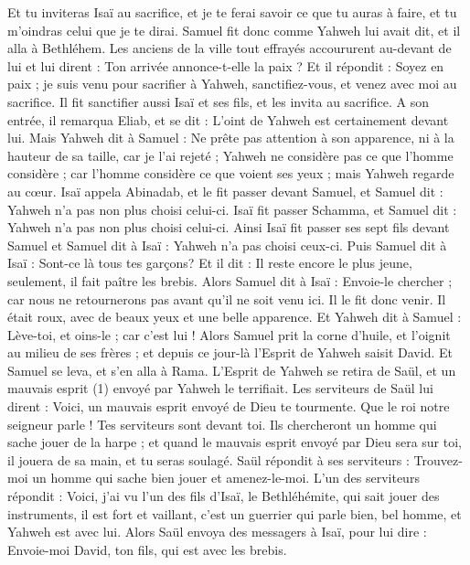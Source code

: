 \begin{multicols}{2}
Et tu inviteras Isaï au sacrifice, et je te ferai savoir ce que tu auras à faire, et tu m'oindras celui que je te dirai.
Samuel fit donc comme Yahweh lui avait dit, et il alla à Bethléhem. Les anciens de la ville tout effrayés accoururent au-devant de lui et lui dirent : Ton arrivée annonce-t-elle la paix ?
Et il répondit : Soyez en paix ; je suis venu pour sacrifier à Yahweh, sanctifiez-vous, et venez avec moi au sacrifice. Il fit sanctifier aussi Isaï et ses fils, et les invita au sacrifice.
A son entrée, il remarqua Eliab, et se dit : L'oint de Yahweh est certainement devant lui.
Mais Yahweh dit à Samuel : Ne prête pas attention à son apparence, ni à la hauteur de sa taille, car je l'ai rejeté ; Yahweh ne considère pas ce que l'homme considère ; car l'homme considère ce que voient ses yeux ; mais Yahweh regarde au cœur.
Isaï appela Abinadab, et le fit passer devant Samuel, et Samuel dit : Yahweh n'a pas non plus choisi celui-ci.
Isaï fit passer Schamma, et Samuel dit : Yahweh n'a pas non plus choisi celui-ci.
Ainsi Isaï fit passer ses sept fils devant Samuel et Samuel dit à Isaï : Yahweh n’a pas choisi ceux-ci.
Puis Samuel dit à Isaï : Sont-ce là tous tes garçons? Et il dit : Il reste encore le plus jeune, seulement, il fait paître les brebis. Alors Samuel dit à Isaï : Envoie-le chercher ; car nous ne retournerons pas avant qu’il ne soit venu ici.
Il le fit donc venir. Il était roux, avec de beaux yeux et une belle apparence. Et Yahweh dit à Samuel : Lève-toi, et oins-le ; car c'est lui !
Alors Samuel prit la corne d'huile, et l'oignit au milieu de ses frères ; et depuis ce jour-là l'Esprit de Yahweh saisit David. Et Samuel se leva, et s'en alla à Rama.
L'Esprit de Yahweh se retira de Saül, et un mauvais esprit (1) envoyé par Yahweh le terrifiait.
Les serviteurs de Saül lui dirent : Voici, un mauvais esprit envoyé de Dieu te tourmente.
Que le roi notre seigneur parle ! Tes serviteurs sont devant toi. Ils chercheront un homme qui sache jouer de la harpe ; et quand le mauvais esprit envoyé par Dieu sera sur toi, il jouera de sa main, et tu seras soulagé.
Saül répondit à ses serviteurs : Trouvez-moi un homme qui sache bien jouer et amenez-le-moi.
L'un des serviteurs répondit : Voici, j'ai vu l’un des fils d'Isaï, le Bethléhémite, qui sait jouer des instruments, il est fort et vaillant, c’est un guerrier qui parle bien, bel homme, et Yahweh est avec lui.
Alors Saül envoya des messagers à Isaï, pour lui dire : Envoie-moi David, ton fils, qui est avec les brebis.

\end{multicols}

